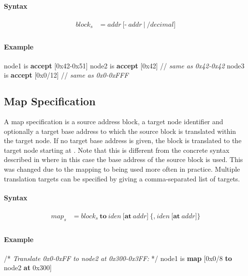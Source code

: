 \documentclass[a4paper,11pt,twoside]{report}
\begin{document}
{{{\paragraph{Syntax}
\begin{align*}
\textit{block}_s & \mathop{=} \textit{addr}\
    \Big[
        \textbf{-}\ \textit{addr}\ 
    \Big|\
        \textbf{/}\textit{decimal}
    \Big] \\
\end{align*}

\paragraph{Example}
\begin{syntax}
    node1 is \textbf{accept} [0x42-0x51]
    node2 is \textbf{accept} [0x42]      // \textit{same as \textup{0x42-0x42}}
    node3 is \textbf{accept} [0x0/12]    // \textit{same as \textup{0x0-0xFFF}}
\end{syntax}

\subsection{Map Specification}
A map specification is a source address block, a target node identifier and optionally a target base address to which the source block is translated within the target node.
If no target base address is given, the block is translated to the target node starting at .
Note that this is different from the concrete syntax described in \cite{achermann:mars17} where in this case the base address of the source block is used.
This was changed due to the mapping to \Sockeye{0x0} being used more often in practice.
Multiple translation targets can be specified by giving a comma-separated list of targets.

\paragraph{Syntax}
\begin{align*}
\textit{map}_s & \mathop{=}
\textit{block}_s\ \textbf{to}\ \textit{iden}\ 
    \Big[
        \textbf{at}\ \textit{addr}
    \Big]\
    \Big\{
        \textbf{,}\ \textit{iden}\ 
        \Big[
            \textbf{at}\ \textit{addr}
        \Big]
    \Big\}\\
\end{align*}

\paragraph{Example}
\begin{syntax}
    /* \textit{Translate \textup{0x0-0xFF} to \textup{node2} at \textup{0x300-0x3FF}:} */
    node1 is \textbf{map} [0x0/8 \textbf{to} node2 \textbf{at} 0x300] 


\end{syntax}}}}
\end{document}
